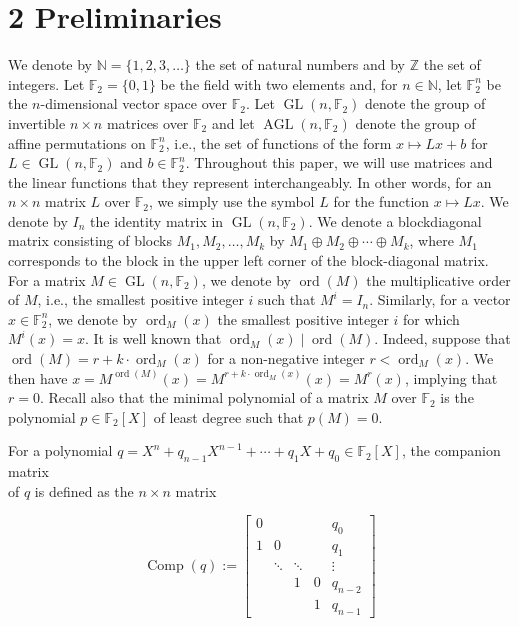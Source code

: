\documentclass[10pt]{article}
\begin{document}
\section*{2 Preliminaries}
We denote by $\mathbb{N}=\{1,2,3, \ldots\}$ the set of natural numbers and by $\mathbb{Z}$ the set of integers. Let $\mathbb{F}_{2}=\{0,1\}$ be the field with two elements and, for $n \in \mathbb{N}$, let $\mathbb{F}_{2}^{n}$ be the $n$-dimensional vector space over $\mathbb{F}_{2}$. Let $\operatorname{GL}\left(n, \mathbb{F}_{2}\right)$ denote the group of invertible $n \times n$ matrices over $\mathbb{F}_{2}$ and let $\operatorname{AGL}\left(n, \mathbb{F}_{2}\right)$ denote the group of affine permutations on $\mathbb{F}_{2}^{n}$, i.e., the set of functions of the form $x \mapsto L x+b$ for $L \in \operatorname{GL}\left(n, \mathbb{F}_{2}\right)$ and $b \in \mathbb{F}_{2}^{n}$. Throughout this paper, we will use matrices and the linear functions that they represent interchangeably. In other words, for an $n \times n$ matrix $L$ over $\mathbb{F}_{2}$, we simply use the symbol $L$ for the function $x \mapsto L x$. We denote by $I_{n}$ the identity matrix in $\operatorname{GL}\left(n, \mathbb{F}_{2}\right)$. We denote a blockdiagonal matrix consisting of blocks $M_{1}, M_{2}, \ldots, M_{k}$ by $M_{1} \oplus M_{2} \oplus \cdots \oplus M_{k}$, where $M_{1}$ corresponds to the block in the upper left corner of the block-diagonal matrix. For a matrix $M \in \operatorname{GL}\left(n, \mathbb{F}_{2}\right)$, we denote by $\operatorname{ord}(M)$ the multiplicative order of $M$, i.e., the smallest positive integer $i$ such that $M^{i}=I_{n}$. Similarly, for a vector $x \in \mathbb{F}_{2}^{n}$, we denote by $\operatorname{ord}_{M}(x)$ the smallest positive integer $i$ for which $M^{i}(x)=x$. It is well known that $\operatorname{ord}_{M}(x) \mid \operatorname{ord}(M)$. Indeed, suppose that $\operatorname{ord}(M)=r+k \cdot \operatorname{ord}_{M}(x)$ for a non-negative integer $r<\operatorname{ord}_{M}(x)$. We then have $x=M^{\operatorname{ord}(M)}(x)=M^{r+k \cdot \operatorname{ord}_{M}(x)}(x)=M^{r}(x)$, implying that $r=0$. Recall also that the minimal polynomial of a matrix $M$ over $\mathbb{F}_{2}$ is the polynomial $p \in \mathbb{F}_{2}[X]$ of least degree such that $p(M)=0$.

For a polynomial $q=X^{n}+q_{n-1} X^{n-1}+\cdots+q_{1} X+q_{0} \in \mathbb{F}_{2}[X]$, the companion matrix\\
of $q$ is defined as the $n \times n$ matrix

$$
\operatorname{Comp}(q):=\left[\begin{array}{ccccc}
0 & & & & q_{0} \\
1 & 0 & & & q_{1} \\
& \ddots & \ddots & & \vdots \\
& & 1 & 0 & q_{n-2} \\
& & & 1 & q_{n-1}
\end{array}\right]
$$
\end{document}
